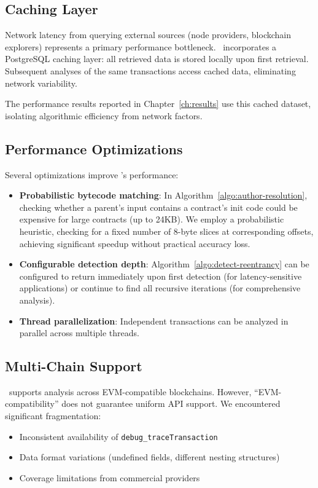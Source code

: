 \subsection{Caching Layer}

Network latency from querying external sources (node providers, blockchain explorers) represents a primary performance bottleneck. \ToolName\ incorporates a PostgreSQL caching layer: all retrieved data is stored locally upon first retrieval. Subsequent analyses of the same transactions access cached data, eliminating network variability.

The performance results reported in Chapter~\ref{ch:results} use this cached dataset, isolating algorithmic efficiency from network factors.

\subsection{Performance Optimizations}

Several optimizations improve \ToolName's performance:

\begin{itemize}
    \item \textbf{Probabilistic bytecode matching}: In Algorithm~\ref{algo:author-resolution}, checking whether a parent's input contains a contract's init code could be expensive for large contracts (up to 24KB). We employ a probabilistic heuristic, checking for a fixed number of 8-byte slices at corresponding offsets, achieving significant speedup without practical accuracy loss.
    
    \item \textbf{Configurable detection depth}: Algorithm~\ref{algo:detect-reentrancy} can be configured to return immediately upon first detection (for latency-sensitive applications) or continue to find all recursive iterations (for comprehensive analysis).
    
    \item \textbf{Thread parallelization}: Independent transactions can be analyzed in parallel across multiple threads.
\end{itemize}

\subsection{Multi-Chain Support}

\ToolName\ supports analysis across  EVM-compatible blockchains. However, ``EVM-compatibility'' does not guarantee uniform API support. We encountered significant fragmentation:
\begin{itemize}
    \item Inconsistent availability of \lstinline{debug_traceTransaction}
    \item Data format variations (\eg undefined fields, different nesting structures)
    \item Coverage limitations from commercial providers
\end{itemize}

